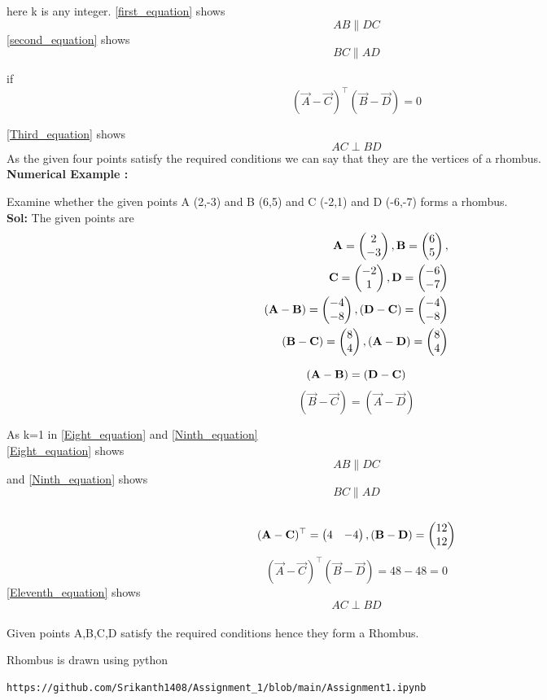 \documentclass{article}
\begin{document}
{here k is any integer.}
\ref{first_equation} shows 
$$AB \parallel DC $$
\ref{second_equation} shows 
$$BC \parallel AD$$

if 
\begin{equation}\label{Third_equation}
(\vec{A}-\vec{C} )^ \top ( \vec{B}-\vec{D} ) = 0 
\end{equation}

\ref{Third_equation} shows
$$AC \perp BD $$
{As the given four points satisfy the required conditions we can say that they are the vertices of a rhombus.}\\
\textbf{Numerical Example :}
 
{Examine whether the given points A (2,-3) and B (6,5) and C (-2,1) and D (-6,-7) forms a rhombus.}\\

 \textbf{Sol:}
 The given points are
\begin{align} 
\vec{A} = \myvec{2\\-3},\vec{B} =\myvec{6\\5},\\
\vec{C} =\myvec{-2\\1}, \vec{D} =\myvec{-6\\-7}\\
(\vec{A}-\vec{B} ) = \myvec{-4\\-8}, (\vec{D}-\vec{C} ) = \myvec{-4\\-8}\\
(\vec{B}-\vec{C} ) = \myvec{8\\4}, (\vec{A}-\vec{D} ) = \myvec{8\\4}
\end{align} 

\begin{equation}\label{Eight_equation}
(\vec{A}-\vec{B} ) = (\vec{D}-\vec{C} )  \\
\end{equation}
\begin{equation}\label{Ninth_equation}
(\vec{B}-\vec{C} )  = (\vec{A}-\vec{D} ) 
\end{equation}

{As k=1 in \ref{Eight_equation} and \ref{Ninth_equation}}\\

\ref{Eight_equation} shows $$ AB  {\parallel} DC $$ and \ref{Ninth_equation} shows $$BC \parallel AD $$\\
    
\begin{align}
(\vec{A}-\vec{C} )^\top = \myvec{4&-4 }
,(\vec{B}-\vec{D} ) = \myvec{12\\12}
\end{align}
\begin{equation}\label{Eleventh_equation}
(\vec{A}-\vec{C} )^ \top ( \vec{B}-\vec{D} ) = 48-48 = 0
\end{equation}
 \ref{Eleventh_equation} shows
$$AC \perp BD $$\\ 
{Given points A,B,C,D satisfy the required 
conditions hence they form a Rhombus.}

{Rhombus is drawn using python}
\begin{lstlisting}
https://github.com/Srikanth1408/Assignment_1/blob/main/Assignment1.ipynb
\end{lstlisting}
\end{document}
